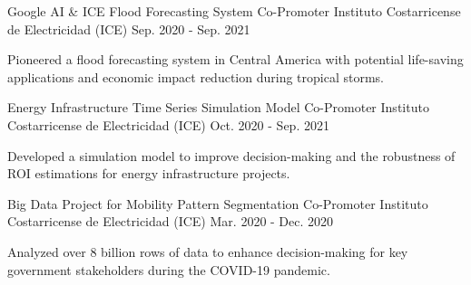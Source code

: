 \begin{cventries}
  \cventry
    {Google AI \& ICE Flood Forecasting System} %
    {Co-Promoter} %
    {Instituto Costarricense de Electricidad (ICE)} %
    {Sep. 2020 - Sep. 2021} %
    {
      \begin{cvitems} %
        \item {Pioneered a flood forecasting system in Central America with potential life-saving applications and economic impact reduction during tropical storms.}
      \end{cvitems}
    }

  \cventry
    {Energy Infrastructure Time Series Simulation Model} %
    {Co-Promoter} %
    {Instituto Costarricense de Electricidad (ICE)} %
    {Oct. 2020 - Sep. 2021} %
    {
      \begin{cvitems} %
        \item {Developed a simulation model to improve decision-making and the robustness of ROI estimations for energy infrastructure projects.}
      \end{cvitems}
    }

  \cventry
    {Big Data Project for Mobility Pattern Segmentation} %
    {Co-Promoter} %
    {Instituto Costarricense de Electricidad (ICE)} %
    {Mar. 2020 - Dec. 2020} %
    {
      \begin{cvitems} %
        \item {Analyzed over 8 billion rows of data to enhance decision-making for key government stakeholders during the COVID-19 pandemic.}
      \end{cvitems}
    }

\end{cventries}